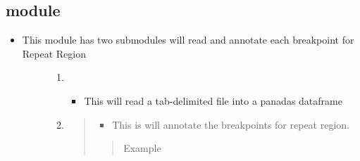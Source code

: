 \documentclass[letterpaper,10pt,english]{sphinxmanual}
\begin{document}
\subsection{ module}
\label{\detokenize{iAnnotateSV:annotateforrepeatregion-module}}\begin{itemize}
\item {} \begin{description}
\item[{This module has two submodules will read and annotate each breakpoint for Repeat Region}] \leavevmode\begin{enumerate}
\item {} 
\begin{itemize}
\item {} 
This will read a tab-delimited file into a panadas dataframe

\end{itemize}

\item {} 
\begin{quote}
\begin{itemize}
\item {} 
This is will annotate the breakpoints for repeat region.

\end{itemize}
\begin{quote}\begin{description}
\item[{Example}] \leavevmode
{}

\end{description}\end{quote}
\end{quote}

\end{enumerate}

\end{description}

\end{itemize}
\end{document}
